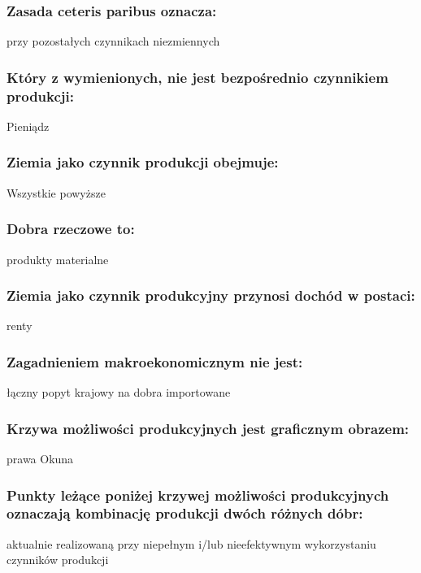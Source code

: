 \documentclass[a4paper,12pt]{article}
\begin{document}
\subsubsection{Zasada ceteris paribus oznacza:}

przy pozostałych czynnikach niezmiennych

\subsubsection{Który z wymienionych, nie jest bezpośrednio czynnikiem produkcji:}

Pieniądz

\subsubsection{Ziemia jako czynnik produkcji obejmuje:}

Wszystkie powyższe

\subsubsection{Dobra rzeczowe to:}

produkty materialne

\subsubsection{Ziemia jako czynnik produkcyjny przynosi dochód w postaci:}

renty

\subsubsection{Zagadnieniem makroekonomicznym nie jest:}

łączny popyt krajowy na dobra importowane

\subsubsection{Krzywa możliwości produkcyjnych jest graficznym obrazem:}

prawa Okuna

\subsubsection{Punkty leżące poniżej krzywej możliwości produkcyjnych oznaczają kombinację produkcji dwóch różnych dóbr:}

aktualnie realizowaną przy niepełnym i/lub nieefektywnym wykorzystaniu czynników produkcji
\end{document}
